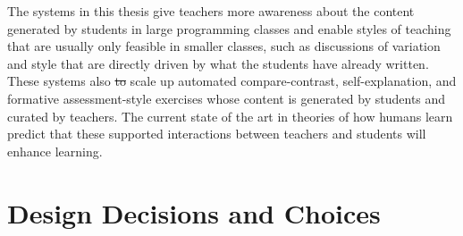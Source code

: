 \documentclass[12pt,twoside]{mitthesis}
\providecommand{\DIFdeltex}[1]{{\protect\color{red}\sout{#1}}}                      %
\providecommand{\DIFdelbegin}{} %
\providecommand{\DIFdelend}{} %
\providecommand{\DIFdel}[1]{\texorpdfstring{\DIFdeltex{#1}}{}} %
\begin{document}
{{{{{{{{{{The systems in this thesis give teachers more awareness about the content generated by students in large programming classes and enable styles of teaching that are usually only feasible in smaller classes, such as discussions of variation and style that are directly driven by what the students have already written. These systems also \DIFdelbegin \DIFdel{to }\DIFdelend scale up automated compare-contrast, self-explanation, and formative assessment-style exercises whose content is generated by students and curated by teachers. \DIFdelbegin %
\DIFdelend The current state of the art in theories of how humans learn predict that these supported interactions between teachers and students will enhance learning.

\DIFdelbegin %



\DIFdelend \section{Design Decisions and Choices}

}}}}}}}}}}
\end{document}
